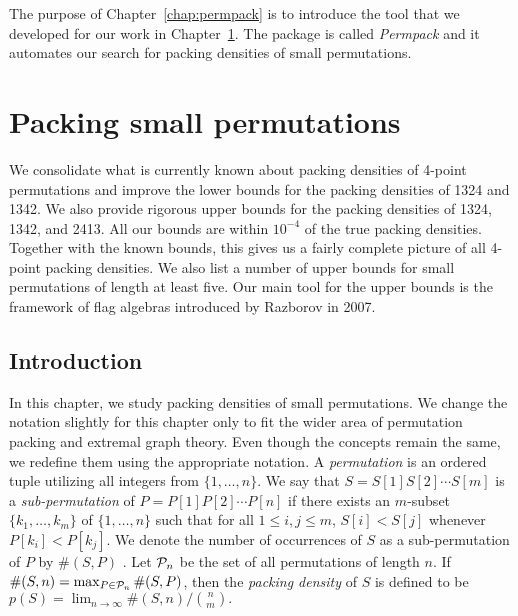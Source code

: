 \documentclass[12pt, a4paper, twoside]{report}
\begin{document}
The purpose of Chapter~\ref{chap:permpack} is to introduce the tool that we developed for our work in Chapter~\ref{chap:packsmall}. The package is called \emph{Permpack} and it automates our search for packing densities of small permutations. 

\chapter{Packing small permutations}
\label{chap:packsmall}
%

We consolidate what is currently known about packing densities of 4-point permutations and improve the lower bounds for the packing densities of 1324 and 1342. We also provide rigorous upper bounds for the packing densities of 1324, 1342, and 2413. All our bounds are within $10^{-4}$ of the true packing densities. Together with the known bounds, this gives us a fairly complete picture of all 4-point packing densities. We also list a number of upper bounds for small permutations of length at least five. Our main tool for the upper bounds is the framework of flag algebras introduced by Razborov in 2007.




\section{Introduction}
\label{sec:intro}

In this chapter, we study packing densities of small permutations. We change the notation slightly for this chapter only to fit the wider area of permutation packing and extremal graph theory. Even though the concepts remain the same, we redefine them using the appropriate notation. A \emph{permutation} is an ordered tuple utilizing all integers from $\{1,\ldots,n\}$. We say that $S = S[1]S[2]\cdots S[m] $ is a \emph{sub-permutation} of $P=P[1]P[2]\cdots P[n]$ if there exists an $m$-subset $\{k_1,\ldots,k_m\}$ of $\{1,\ldots,n\}$ such that for all $1 \leq i,j \leq m$, $S[i] < S[j]$ whenever $P[k_i] < P[k_j]$. We denote the number of occurrences of $S$ as a sub-permutation of $P$ by $\#(S,P)$ . Let $\P_n$ be the set of all permutations of length $n$. If $\#(S,n) = \max_{P \in \P_n}\#(S,P)$, then the \emph{packing density} of $S$ is defined to be $p(S) = \lim_{n\to\infty} \#(S,n)/\binom{n}{m}.$
\end{document}
